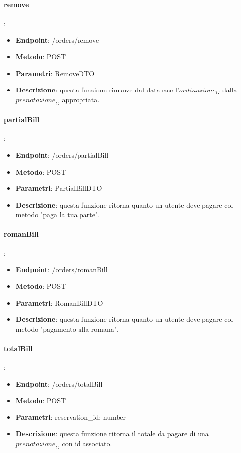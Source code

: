 \paragraph{remove}:
\begin{itemize}
    \item \textbf{Endpoint}: /orders/remove
    \item \textbf{Metodo}: POST
    \item \textbf{Parametri}: RemoveDTO
    \item \textbf{Descrizione}: questa funzione rimuove dal database l'$\textit{ordinazione}_G$ dalla $\textit{prenotazione}_G$ appropriata.
\end{itemize}
\paragraph{partialBill}:
\begin{itemize}
    \item \textbf{Endpoint}: /orders/partialBill
    \item \textbf{Metodo}: POST
    \item \textbf{Parametri}: PartialBillDTO
    \item \textbf{Descrizione}: questa funzione ritorna quanto un utente deve pagare col metodo "paga la tua parte".
\end{itemize}
\paragraph{romanBill}:
\begin{itemize}
    \item \textbf{Endpoint}: /orders/romanBill
    \item \textbf{Metodo}: POST
    \item \textbf{Parametri}: RomanBillDTO
    \item \textbf{Descrizione}: questa funzione ritorna quanto un utente deve pagare col metodo "pagamento alla romana".
\end{itemize}
\paragraph{totalBill}:
\begin{itemize}
    \item \textbf{Endpoint}: /orders/totalBill
    \item \textbf{Metodo}: POST
    \item \textbf{Parametri}: reservation\_id: number
    \item \textbf{Descrizione}: questa funzione ritorna il totale da pagare di una $\textit{prenotazione}_G$ con id associato.
\end{itemize}

